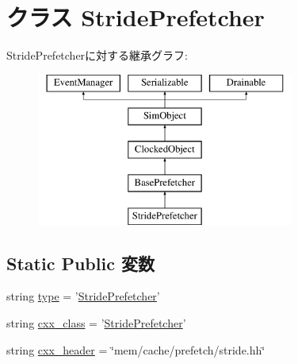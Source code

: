\hypertarget{classPrefetcher_1_1StridePrefetcher}{
\section{クラス StridePrefetcher}
\label{classPrefetcher_1_1StridePrefetcher}
}
StridePrefetcherに対する継承グラフ:\begin{figure}[H]
\begin{center}
\leavevmode
\includegraphics[height=5cm]{classPrefetcher_1_1StridePrefetcher}
\end{center}
\end{figure}
\subsection*{Static Public 変数}
\begin{DoxyCompactItemize}
\item 
string \hyperlink{classPrefetcher_1_1StridePrefetcher_acce15679d830831b0bbe8ebc2a60b2ca}{type} = '\hyperlink{classPrefetcher_1_1StridePrefetcher}{StridePrefetcher}'
\item 
string \hyperlink{classPrefetcher_1_1StridePrefetcher_a58cd55cd4023648e138237cfc0822ae3}{cxx\_\-class} = '\hyperlink{classPrefetcher_1_1StridePrefetcher}{StridePrefetcher}'
\item 
string \hyperlink{classPrefetcher_1_1StridePrefetcher_a17da7064bc5c518791f0c891eff05fda}{cxx\_\-header} = \char`\"{}mem/cache/prefetch/stride.hh\char`\"{}
\end{DoxyCompactItemize}


